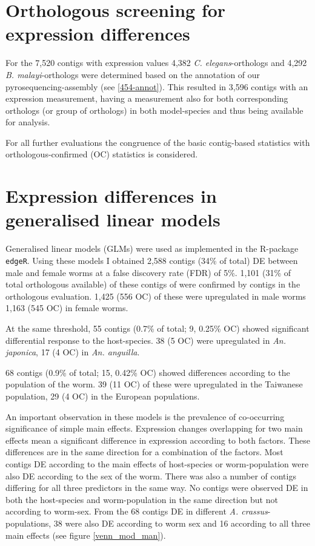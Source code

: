 \section{Orthologous screening for expression differences}

For the 7,520 contigs with expression values 4,382
\textit{C. elegans}-orthologs and 4,292 \textit{B. malayi}-orthologs
were determined based on the annotation of our pyrosequencing-assembly
(see \ref{454-annot}). This resulted in 3,596 contigs with an
expression measurement, having a measurement also for both
corresponding orthologs (or group of orthologs) in both model-species
and thus being available for analysis.

For all further evaluations the congruence of the basic contig-based
statistics with orthologous-confirmed (OC) statistics is considered.

\section{Expression differences in generalised linear models}

Generalised linear models (GLMs) were used as implemented in the
R-package \texttt{edgeR}. Using these models I obtained 2,588 contigs
(34\% of total) DE between male and female worms at a false discovery
rate (FDR) of 5\%. 1,101 (31\% of total orthologous available) of
these contigs of were confirmed by contigs in the orthologous
evaluation. 1,425 (556 OC) of these were upregulated in male worms
1,163 (545 OC) in female worms.

At the same threshold, 55 contigs (0.7\% of total; 9, 0.25\% OC)
showed significant differential response to the host-species. 38 (5
OC) were upregulated in \textit{An. japonica}, 17 (4 OC) in
\textit{An. anguilla}.

68 contigs (0.9\% of total; 15, 0.42\% OC) showed differences
according to the population of the worm. 39 (11 OC) of these were
upregulated in the Taiwanese population, 29 (4 OC) in the European
populations.

An important observation in these models is the prevalence of
co-occurring significance of simple main effects. Expression changes
overlapping for two main effects mean a significant difference in
expression according to both factors. These differences are in the
same direction for a combination of the factors. Most contigs DE
according to the main effects of host-species or worm-population were
also DE according to the sex of the worm. There was also a number of
contigs differing for all three predictors in the same way. No contigs
were observed DE in both the host-species and worm-population in the
same direction but not according to worm-sex. From the 68 contigs DE
in different \textit{A. crassus}-populations, 38 were also DE
according to worm sex and 16 according to all three main effects (see
figure \ref{venn_mod_man}).

